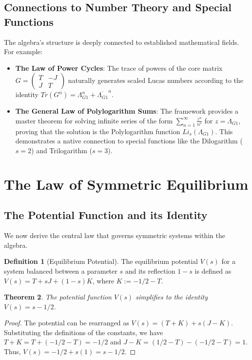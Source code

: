 \documentclass{amsart}
\theoremstyle{plain}
\newtheorem{theorem}{Theorem}
\theoremstyle{definition}
\newtheorem{definition}[theorem]{Definition}
\theoremstyle{remark}
\begin{document}
\subsection{Connections to Number Theory and Special Functions}
The algebra's structure is deeply connected to established mathematical fields. For example:
\begin{itemize}
    \item \textbf{The Law of Power Cycles}: The trace of powers of the core matrix $G = \left(\begin{smallmatrix} T & -J \\ J & T \end{smallmatrix}\right)$ naturally generates scaled Lucas numbers according to the identity $Tr(G^n) = \Lambda_{G1}^n + \overline{\Lambda_{G1}}^n$.
    \item \textbf{The General Law of Polylogarithm Sums}: The framework provides a master theorem for solving infinite series of the form $\sum_{n=1}^\infty \frac{z^n}{n^s}$ for $z=\Lambda_{G1}$, proving that the solution is the Polylogarithm function $Li_s(\Lambda_{G1})$. This demonstrates a native connection to special functions like the Dilogarithm ($s=2$) and Trilogarithm ($s=3$).
\end{itemize}

\section{The Law of Symmetric Equilibrium}
\subsection{The Potential Function and its Identity}
We now derive the central law that governs symmetric systems within the algebra.
\begin{definition}[Equilibrium Potential]
The equilibrium potential $V(s)$ for a system balanced between a parameter $s$ and its reflection $1-s$ is defined as $V(s) = T + sJ + (1-s)K$, where $K := -1/2 - T$.
\end{definition}

\begin{theorem}\label{thm:potential_id}
The potential function $V(s)$ simplifies to the identity $V(s) = s - 1/2$.
\end{theorem}
\begin{proof}
The potential can be rearranged as $V(s) = (T+K) + s(J-K)$. Substituting the definitions of the constants, we have $T+K = T + (-1/2 - T) = -1/2$ and $J-K = (1/2 - T) - (-1/2-T) = 1$. Thus, $V(s) = -1/2 + s(1) = s - 1/2$.
\end{proof}
\end{document}
